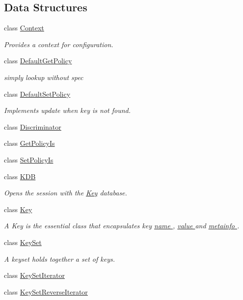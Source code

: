 \subsection*{Data Structures}
\begin{DoxyCompactItemize}
\item 
class \hyperlink{classkdb_1_1Context}{Context}
\begin{DoxyCompactList}\small\item\em Provides a context for configuration. \end{DoxyCompactList}\item 
class \hyperlink{classkdb_1_1DefaultGetPolicy}{Default\-Get\-Policy}
\begin{DoxyCompactList}\small\item\em simply lookup without spec \end{DoxyCompactList}\item 
class \hyperlink{classkdb_1_1DefaultSetPolicy}{Default\-Set\-Policy}
\begin{DoxyCompactList}\small\item\em Implements update when key is not found. \end{DoxyCompactList}\item 
class \hyperlink{classkdb_1_1Discriminator}{Discriminator}
\item 
class \hyperlink{classkdb_1_1GetPolicyIs}{Get\-Policy\-Is}
\item 
class \hyperlink{classkdb_1_1SetPolicyIs}{Set\-Policy\-Is}
\item 
class \hyperlink{classkdb_1_1KDB}{K\-D\-B}
\begin{DoxyCompactList}\small\item\em Opens the session with the \hyperlink{classkdb_1_1Key}{Key} database.   \end{DoxyCompactList}\item 
class \hyperlink{classkdb_1_1Key}{Key}
\begin{DoxyCompactList}\small\item\em A Key is the essential class that encapsulates key \hyperlink{group__keyname}{name }, \hyperlink{group__keyvalue}{value } and \hyperlink{group__keymeta}{metainfo }.  \end{DoxyCompactList}\item 
class \hyperlink{classkdb_1_1KeySet}{Key\-Set}
\begin{DoxyCompactList}\small\item\em A keyset holds together a set of keys. \end{DoxyCompactList}\item 
class \hyperlink{classkdb_1_1KeySetIterator}{Key\-Set\-Iterator}
\item 
class \hyperlink{classkdb_1_1KeySetReverseIterator}{Key\-Set\-Reverse\-Iterator}
\end{DoxyCompactItemize}
